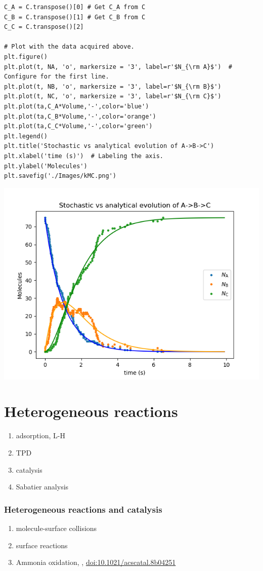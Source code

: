 \documentclass[11pt]{article}
\begin{document}
\begin{verbatim}
C_A = C.transpose()[0] # Get C_A from C
C_B = C.transpose()[1] # Get C_B from C
C_C = C.transpose()[2]

# Plot with the data acquired above.
plt.figure()
plt.plot(t, NA, 'o', markersize = '3', label=r'$N_{\rm A}$')  # Configure for the first line.
plt.plot(t, NB, 'o', markersize = '3', label=r'$N_{\rm B}$')
plt.plot(t, NC, 'o', markersize = '3', label=r'$N_{\rm C}$')
plt.plot(ta,C_A*Volume,'-',color='blue')
plt.plot(ta,C_B*Volume,'-',color='orange')
plt.plot(ta,C_C*Volume,'-',color='green')
plt.legend()
plt.title('Stochastic vs analytical evolution of A->B->C')
plt.xlabel('time (s)')  # Labeling the axis.
plt.ylabel('Molecules')
plt.savefig('./Images/kMC.png')
\end{verbatim}

\begin{center}
\includegraphics[width=.9\linewidth]{./Images/kMC.png}
\end{center}




\section{Heterogeneous reactions}
\label{sec:org1217c51}
\begin{enumerate}
\item adsorption, L-H
\item TPD
\item catalysis
\item Sabatier analysis
\end{enumerate}
\subsubsection{Heterogeneous reactions and catalysis}
\label{sec:orge7e8ec1}
\begin{enumerate}
\item molecule-surface collisions
\item surface reactions
\item Ammonia oxidation, , \href{http://pubs.acs.org/doi/10.1021/acscatal.8b04251}{doi:10.1021/acscatal.8b04251}
\end{enumerate}
\end{document}

